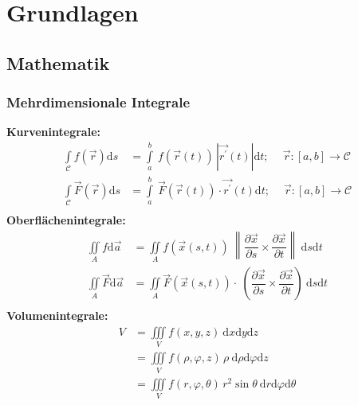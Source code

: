         \maketitle
        \tableofcontents
		\section{Grundlagen}
		\subsection{Mathematik}
		\subsubsection{Mehrdimensionale Integrale}
		\begin{center}
			\textbf{Kurvenintegrale:}\\%
			\begin{align*}
				\int\limits_{\mathcal{C}}f(\vec{r})\mathrm{d}s &= \int\limits_a^b\ f(\vec{r}(t))\,|\vec{r^{\prime}}(t)|\mathrm{d}t;\
				\quad \vec{r}:[a,b]\to\mathcal{C}\\
				\int\limits_{\mathcal{C}}\vec{F}(\vec{r})\mathrm{d}s &= \int\limits_a^b\ \vec{F}(\vec{r}(t))\cdot\vec{r^{\prime}}(t)\mathrm{d}t;\
				\quad \vec{r}:[a,b]\to\mathcal{C}\\
			\end{align*}
			\textbf{Oberflächenintegrale:}
			\begin{align*}
				\iint\limits_A f \mathrm{d}\vec{a} &= \iint\limits_A f(\vec{x}(s,t))\!\
				\left\|\dfrac{\partial\vec{x}}{\partial s}\times\dfrac{\partial\vec{x}}{\partial t}\right\|\
				\mathrm{d}s\mathrm{d}t\\
				\iint\limits_A \vec{F} \mathrm{d}\vec{a} &= \iint\limits_A \vec{F}(\vec{x}(s,t))\cdot\!\
				\left( \dfrac{\partial\vec{x}}{\partial s}\times\dfrac{\partial\vec{x}}{\partial t} \right)\
				\!\mathrm{d}s\mathrm{d}t\\
			\end{align*}
			\textbf{Volumenintegrale:}
			\begin{align*}
				V &= \iiint\limits_V f(x,y,z)\:\mathrm{d}x\mathrm{d}y\mathrm{d}z\\
				&= \iiint\limits_V f(\rho,\varphi,z)\,\rho\:\mathrm{d}\rho\mathrm{d}\varphi\mathrm{d}z\\
				&= \iiint\limits_V f(r,\varphi,\theta)\,r^2\sin\theta\:\mathrm{d}r\mathrm{d}\varphi\mathrm{d}\theta\\
			\end{align*}
		\end{center}
